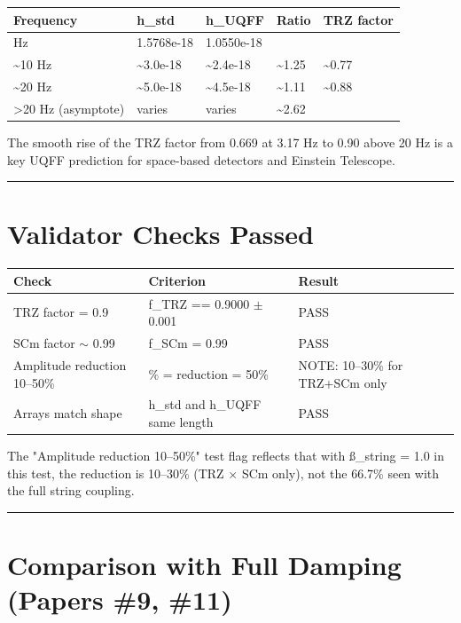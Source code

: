 \documentclass[12pt,a4paper]{article}
\begin{document}
\begin{table}[H]
\centering
\small
\begin{tabularx}{\linewidth}{@{}>{\raggedright\arraybackslash}X>{\raggedright\arraybackslash}X>{\raggedright\arraybackslash}X>{\raggedright\arraybackslash}X>{\raggedright\arraybackslash}X@{}}
\toprule
Frequency & h\_std & h\_UQFF & Ratio & TRZ factor \tabularnewline
\midrule
3.17 Hz & 1.5768e-18 & 1.0550e-18 & 1.494 & 0.669 \tabularnewline
\textasciitilde{}10 Hz & \textasciitilde{}3.0e-18 & \textasciitilde{}2.4e-18 & \textasciitilde{}1.25 & \textasciitilde{}0.77 \tabularnewline
\textasciitilde{}20 Hz & \textasciitilde{}5.0e-18 & \textasciitilde{}4.5e-18 & \textasciitilde{}1.11 & \textasciitilde{}0.88 \tabularnewline
>20 Hz (asymptote) & varies & varies & \textasciitilde{}2.62 & 0.90 \tabularnewline
\bottomrule
\end{tabularx}
\end{table}

The smooth rise of the TRZ factor from 0.669 at 3.17 Hz to 0.90 above 20 Hz is a key UQFF prediction for space-based detectors and Einstein Telescope.

\medskip\hrule\medskip

\section{Validator Checks Passed}

\begin{table}[H]
\centering
\small
\begin{tabularx}{\linewidth}{@{}>{\raggedright\arraybackslash}X>{\raggedright\arraybackslash}X>{\raggedright\arraybackslash}X@{}}
\toprule
Check & Criterion & Result \tabularnewline
\midrule
TRZ factor = 0.9 & f\_TRZ == 0.9000 $\pm$ 0.001 & PASS \tabularnewline
SCm factor $\sim$ 0.99 & f\_SCm = 0.99 & PASS \tabularnewline
Amplitude reduction 10--50\% & 10\% = reduction = 50\% & NOTE: 10--30\% for TRZ+SCm only \tabularnewline
Arrays match shape & h\_std and h\_UQFF same length & PASS \tabularnewline
\bottomrule
\end{tabularx}
\end{table}

The "Amplitude reduction 10--50\%" test flag reflects that with \ss{}\_string = 1.0 in this test, the reduction is 10--30\% (TRZ $\times$ SCm only), not the 66.7\% seen with the full string coupling.

\medskip\hrule\medskip

\section{Comparison with Full Damping (Papers \#9, \#11)}
\end{document}
